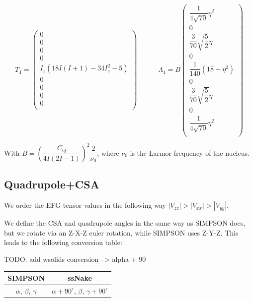 \documentclass[11pt,a4paper]{article}
\begin{document}
\begin{equation}
  T_{4} = \left( \begin{array}{c}
0 \\
0 \\
0 \\
0 \\
I_z (18 I (I + 1) -34 I_z^2 -5) \\
0 \\
0\\
0 \\
0 \\
  \end{array} \right)
  \quad\quad\quad
  \Lambda_{4} = B
  \left( \begin{array}{c}
\dfrac{1}{4 \sqrt{70}} \eta^2 \\
0 \\
\dfrac{3}{70}  \sqrt{\dfrac{5}{2}} \eta\\
0 \\
 \dfrac{1}{140} (18  + \eta^2) \\
0 \\
\dfrac{3}{70}  \sqrt{\dfrac{5}{2}} \eta\\
0 \\
\dfrac{1}{4 \sqrt{70}} \eta^2 \\
  \end{array} \right)
\end{equation}


With $B = \left( \dfrac{C_\text{Q}}{4 I (2 I - 1)} \right) ^ 2  \dfrac{2}{\nu_0}$, where $\nu_0$ is
the Larmor frequency of the nucleus.


\subsection{Quadrupole+CSA}


We order the EFG tensor values in the following way $|V_{zz}|>|V_{xx}|>|V_{yy}|$.

We define the CSA and quadrupole angles in the same way as SIMPSON does, but we rotate via
an Z-X-Z euler rotation, while SIMPSON uses Z-Y-Z. This leads to the following conversion table:

TODO: add wsolids conversion --> alpha + 90

\begin{center}
\begin{tabular}{cc}
\toprule
\textbf{SIMPSON} & \textbf{ssNake}\\
\midrule
$\alpha$, $\beta$, $\gamma$ & $\alpha + 90^\circ$, $\beta$, $\gamma + 90^\circ$ \\
\bottomrule
\end{tabular}
\end{center}
\end{document}
